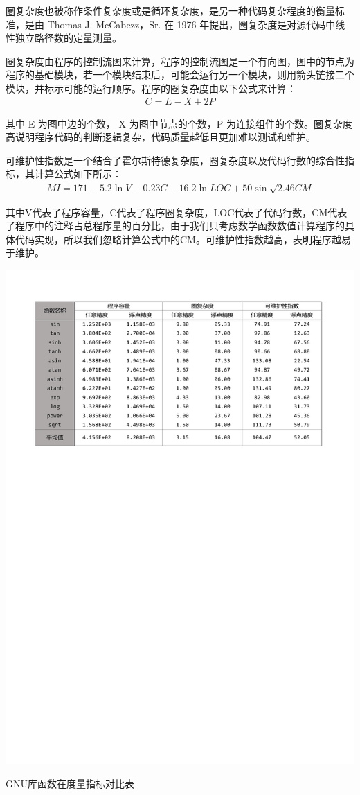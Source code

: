 圈复杂度也被称作条件复杂度或是循环复杂度，是另一种代码复杂程度的衡量标准，是由 Thomas J. McCabezz，Sr. 在 1976 年提出，圈复杂度是对源代码中线性独立路径数的定量测量。

圈复杂度由程序的控制流图\cite{Allen:1970:CFA:390013.808479}来计算，程序的控制流图是一个有向图，图中的节点为程序的基础模块，若一个模块结束后，可能会运行另一个模块，则用箭头链接二个模块，并标示可能的运行顺序。程序的圈复杂度由以下公式来计算：
\begin{align*}
    C = E - X + 2P
\end{align*}

其中 E 为图中边的个数， X 为图中节点的个数，P 为连接组件的个数。圈复杂度高说明程序代码的判断逻辑复杂，代码质量越低且更加难以测试和维护。

可维护性指数是一个结合了霍尔斯特德复杂度，圈复杂度以及代码行数的综合性指标，其计算公式如下所示：
\begin{align*}
    MI = 171 - 5.2\ln V - 0.23C - 16.2\ln LOC + 50\sin\sqrt{2.46CM}
\end{align*}

其中V代表了程序容量，C代表了程序圈复杂度，LOC代表了代码行数，CM代表了程序中的注释占总程序量的百分比，由于我们只考虑数学函数数值计算程序的具体代码实现，所以我们忽略计算公式中的CM。可维护性指数越高，表明程序越易于维护。

\begin{table}[thbp]
    \centering
    \includegraphics[width=\columnwidth]{fig/EvalTable_ComplexMeasurements.pdf}
    \caption{GNU库函数在度量指标对比表} \label{fig:complex_measurements}
 \end{table}

